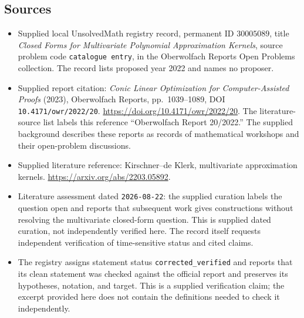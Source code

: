 \documentclass[11pt]{article}
\begin{document}
\subsection{Sources}
\begin{itemize}
\item Supplied local UnsolvedMath registry record, permanent ID \(30005089\), title \emph{Closed Forms for Multivariate Polynomial Approximation Kernels}, source problem code \texttt{catalogue entry}, in the Oberwolfach Reports Open Problems collection. The record lists proposed year 2022 and names no proposer.
\item Supplied report citation: \emph{Conic Linear Optimization for Computer-Assisted Proofs} (2023), Oberwolfach Reports, pp.\ 1039--1089, DOI \texttt{10.4171/owr/2022/20}. \url{https://doi.org/10.4171/owr/2022/20}. The literature-source list labels this reference ``Oberwolfach Report 20/2022.'' The supplied background describes these reports as records of mathematical workshops and their open-problem discussions.
\item Supplied literature reference: Kirschner--de Klerk, multivariate approximation kernels. \url{https://arxiv.org/abs/2203.05892}.
\item Literature assessment dated \texttt{2026-08-22}: the supplied curation labels the question open and reports that subsequent work gives constructions without resolving the multivariate closed-form question. This is supplied dated curation, not independently verified here. The record itself requests independent verification of time-sensitive status and cited claims.
\item The registry assigns statement status \texttt{corrected\_verified} and reports that its clean statement was checked against the official report and preserves its hypotheses, notation, and target. This is a supplied verification claim; the excerpt provided here does not contain the definitions needed to check it independently.
\end{itemize}
\end{document}
